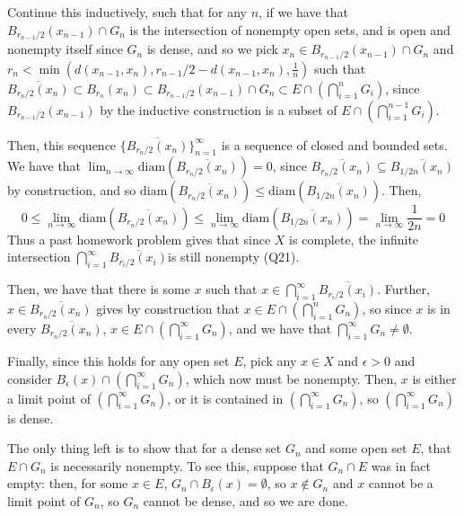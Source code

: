 \documentclass[12pt,letterpaper]{article}
\theoremstyle{definition}
\begin{document}
Continue this inductively, such that for any $n$, if we have that $B_{r_{n-1}/2}(x_{n-1}) \cap G_{n}$ is the intersection of nonempty open sets, and is open and nonempty itself since $G_{n}$ is dense, and so we pick $x_{n} \in B_{r_{n-1}/2}(x_{n-1}) \cap G_{n}$ and $r_{n} < \min(d(x_{n-1},x_{n}), r_{n-1}/2 - d(x_{n-1},x_{n}), \frac{1}{n})$ such that $\overline{B_{r_{n}/2}(x_{n})} \subset B_{r_{n}}(x_{n}) \subset B_{r_{n-1}/2}(x_{n-1}) \cap G_{n} \subset E \cap \left(\bigcap_{i=1}^{n}G_{i}\right)$, since $B_{r_{n-1}/2}(x_{n-1})$ by the inductive construction is a subset of $E \cap \left(\bigcap_{i=1}^{n-1}G_{i}\right)$.

Then, this sequence $\{\overline{B_{r_{n}/2}(x_{n})}\}_{n=1}^{\infty}$ is a sequence of closed and bounded sets. We have that $\lim_{n \rightarrow \infty} \text{diam}(\overline{B_{r_{n}/2}(x_{n})}) = 0$, since $\overline{B_{r_{n}/2}(x_{n})} \subseteq \overline{B_{1/2n}(x_{n})}$ by construction, and so $\text{diam}(\overline{B_{r_{n}/2}(x_{n})}) \leq \text{diam}(\overline{B_{1/2n}(x_{n})})$. Then,
\[
  0 \leq \lim_{n \rightarrow \infty} \text{diam}(\overline{B_{r_{n}/2}(x_{n})}) \leq \lim_{n \rightarrow \infty}\text{diam}(\overline{B_{1/2n}(x_{n})}) = \lim_{n \rightarrow \infty}\frac{1}{2n} = 0
\]
Thus a past homework problem gives that since $X$ is complete, the infinite intersection $\bigcap_{i=1}^{\infty}\overline{B_{r_{i}/2}(x_{i})}$is still nonempty (Q21).

Then, we have that there is some $x$ such that $x \in \bigcap_{i=1}^{\infty}\overline{B_{r_{i}/2}(x_{i})}$. Further, $x \in \overline{B_{r_{n}/2}(x_{n})}$ gives by construction that $x \in E \cap \left(\bigcap_{i=1}^{n}G_{n}\right)$, so since $x$ is in every $\overline{B_{r_{n}/2}(x_{n})}$, $x \in E \cap \left(\bigcap_{i=1}^{\infty}G_{n}\right)$, and we have that $\bigcap_{i=1}^{\infty}G_{n} \neq \emptyset$.


Finally, since this holds for any open set $E$, pick any $x \in X$ and $\epsilon > 0$ and consider $B_{\epsilon}(x) \cap \left(\bigcap_{i=1}^{\infty}G_{n}\right)$, which now must be nonempty. Then, $x$ is either a limit point of $\left(\bigcap_{i=1}^{\infty}G_{n}\right)$, or it is contained in $\left(\bigcap_{i=1}^{\infty}G_{n}\right)$, so $\left(\bigcap_{i=1}^{\infty}G_{n}\right)$ is dense.

The only thing left is to show that for a dense set $G_{n}$ and some open set $E$, that $E \cap G_{n}$ is necessarily nonempty. To see this, suppose that $G_{n} \cap E$ was in fact empty: then, for some $x \in E$, $G_{n} \cap B_{\epsilon}(x) = \emptyset$, so $x \notin G_{n}$ and $x$ cannot be a limit point of $G_{n}$, so $G_{n}$ cannot be dense, and so we are done.
\end{document}
